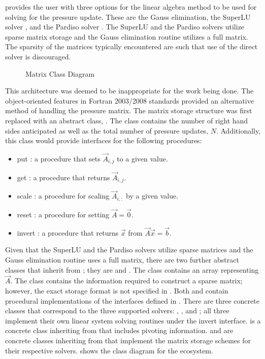 \cobra{} provides the user with three options for the linear algebra method to be used for solving for the pressure update.
These are the Gauss elimination, the SuperLU solver \cite{Li1999}, and the Pardiso solver \cite{Schenk2006, Schenk2007}.
The SuperLU and the Pardiso solvers utilize sparse matrix storage and the Gauss elimination routine utilizes a full matrix.
The sparsity of the matrices typically encountered are such that use of the direct solver is discouraged.

\begin{figure}[ht!]
\singlespace\centering

\caption{Matrix Class Diagram}
\label{fig:matrixClassDiagram}
\end{figure}

This architecture was deemed to be inappropriate for the work being done.
The object-oriented features in Fortran 2003/2008 standards provided an alternative method of handling the pressure matrix.
The matrix storage structure was first replaced with an abstract class, .
The  class contains the number of right hand sides anticipated as well as the total number of pressure updates, $N$.
Additionally, this class would provide interfaces for the following procedures:

\begin{itemize}
\item{put : a procedure that sets $\vec{A}_{i,j}$ to a given value.}
\item{get : a procedure that returns $\vec{A}_{i,j}$.}
\item{scale : a procedure for scaling $\vec{A}_{i, :}$ by a given value.}
\item{reset : a procedure for setting $\vec{A} = \vec{0}$.}
\item{invert : a procedure that returns $\vec{x}$ from $\vec{A}\vec{x} = \vec{b}$.}
\end{itemize}

Given that the SuperLU and the Pardiso solvers utilize sparse matrices and the Gauss elimination routine uses a full matrix, there are two further abstract classes that inherit from ; they are  and .
The  class contains an array representing $\vec{A}$.
The  class contains the information required to construct a sparse matrix; however, the exact storage format is not specified in .
Both  and  contain procedural implementations of the interfaces defined in .
There are three concrete classes that correspond to the three supported solvers: , , and ; all three implement their own linear system solving routines under the invert interface.
 is a concrete class inheriting from  that includes pivoting information.
 and  are concrete classes inheriting from  that implement the matrix storage schemes for their respective solvers.
 shows the class diagram for the  ecosystem.

